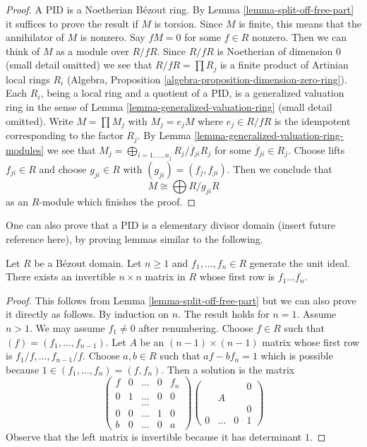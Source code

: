 \begin{proof}
A PID is a Noetherian B\'ezout ring. By Lemma \ref{lemma-split-off-free-part}
it suffices to prove the result if $M$ is torsion. Since $M$ is finite, this
means that the annihilator of $M$ is nonzero. Say $fM = 0$ for some
$f \in R$ nonzero. Then we can think of $M$ as a module over $R/fR$.
Since $R/fR$ is Noetherian of dimension $0$ (small detail omitted)
we see that $R/fR = \prod R_j$ is a finite product of Artinian
local rings $R_i$
(Algebra, Proposition \ref{algebra-proposition-dimension-zero-ring}).
Each $R_i$, being a local ring and a quotient of a PID, is a generalized
valuation ring in the sense of
Lemma \ref{lemma-generalized-valuation-ring} (small detail omitted).
Write $M = \prod M_j$ with $M_j = e_j M$ where $e_j \in R/fR$ is
the idempotent corresponding to the factor $R_j$.
By Lemma \ref{lemma-generalized-valuation-ring-modules}
we see that $M_j = \bigoplus_{i = 1, \ldots, n_j} R_j/\overline{f}_{ji}R_j$
for some $\overline{f}_{ji} \in R_j$. Choose lifts $f_{ji} \in R$
and choose $g_{ji} \in R$ with $(g_{ji}) = (f_j, f_{ji})$.
Then we conclude that
$$
M \cong \bigoplus R/g_{ji}R
$$
as an $R$-module which finishes the proof.
\end{proof}

\noindent
One can also prove that a PID is a elementary divisor domain (insert future
reference here), by proving lemmas similar to the following.

\begin{lemma}
\label{lemma-unimodular-vector}
Let $R$ be a B\'ezout domain. Let $n \geq 1$ and $f_1, \ldots, f_n \in R$
generate the unit ideal. There exists an invertible $n \times n$ matrix in
$R$ whose first row is $f_1 \ldots f_n$.
\end{lemma}

\begin{proof}
This follows from Lemma \ref{lemma-split-off-free-part}
but we can also prove it directly as follows.
By induction on $n$. The result holds for $n = 1$. Assume $n > 1$.
We may assume $f_1 \not = 0$ after renumbering.
Choose $f \in R$ such that $(f) = (f_1, \ldots, f_{n - 1})$.
Let $A$ be an $(n - 1) \times (n - 1)$ matrix whose first row
is $f_1/f, \ldots, f_{n - 1}/f$. Choose $a, b \in R$ such that
$af - bf_n = 1$ which is possible because
$1 \in (f_1, \ldots, f_n) = (f, f_n)$. Then a solution is
the matrix
$$
\left(
\begin{matrix}
f & 0 & \ldots & 0 & f_n \\
0 & 1 & \ldots & 0 & 0 \\
  &   & \ldots \\
0 & 0 & \ldots & 1 & 0 \\
b & 0 & \ldots & 0 & a
\end{matrix}
\right)
\left(
\begin{matrix}
  & & & 0 \\
  & A \\
  & & & 0 \\
0 & \ldots & 0 & 1
\end{matrix}
\right)
$$
Observe that the left matrix is invertible because it has determinant $1$.
\end{proof}






